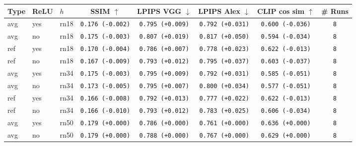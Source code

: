 \begin{tabular}{|l|l|l|c|c|c|c|c|}
\hline
Type & ReLU & $h$ & SSIM $\uparrow$ & LPIPS VGG $\downarrow$ & LPIPS Alex $\downarrow$ & CLIP cos sim $\uparrow$ & \# Runs \\
\hline
avg & yes & rn18 & \texttt{0.176 {\color{red}(-0.002)}} & \texttt{0.795 {\color{red}(+0.009)}} & \texttt{0.792 {\color{red}(+0.031)}} & \texttt{0.600 {\color{red}(-0.036)}} & \texttt{8} \\
avg & no & rn18 & \texttt{0.175 {\color{red}(-0.003)}} & \texttt{0.807 {\color{red}(+0.019)}} & \texttt{0.817 {\color{red}(+0.050)}} & \texttt{0.594 {\color{red}(-0.034)}} & \texttt{8} \\
ref & yes & rn18 & \texttt{0.170 {\color{red}(-0.004)}} & \texttt{0.786 {\color{red}(+0.007)}} & \texttt{0.778 {\color{red}(+0.023)}} & \texttt{0.622 {\color{red}(-0.013)}} & \texttt{8} \\
ref & no & rn18 & \texttt{0.167 {\color{red}(-0.009)}} & \texttt{0.793 {\color{red}(+0.012)}} & \texttt{0.795 {\color{red}(+0.037)}} & \texttt{0.603 {\color{red}(-0.037)}} & \texttt{8} \\
\hline
avg & yes & rn34 & \texttt{0.175 {\color{red}(-0.003)}} & \texttt{0.795 {\color{red}(+0.009)}} & \texttt{0.792 {\color{red}(+0.031)}} & \texttt{0.585 {\color{red}(-0.051)}} & \texttt{8} \\
avg & no & rn34 & \texttt{0.173 {\color{red}(-0.005)}} & \texttt{0.795 {\color{red}(+0.007)}} & \texttt{0.800 {\color{red}(+0.034)}} & \texttt{0.577 {\color{red}(-0.051)}} & \texttt{8} \\
ref & yes & rn34 & \texttt{0.166 {\color{red}(-0.008)}} & \texttt{0.792 {\color{red}(+0.013)}} & \texttt{0.777 {\color{red}(+0.022)}} & \texttt{0.622 {\color{red}(-0.013)}} & \texttt{8} \\
ref & no & rn34 & \texttt{0.166 {\color{red}(-0.010)}} & \texttt{0.793 {\color{red}(+0.012)}} & \texttt{0.783 {\color{red}(+0.025)}} & \texttt{0.606 {\color{red}(-0.034)}} & \texttt{8} \\
\hline
\rowcolor{verylightgray}avg & yes & rn50 & \texttt{0.179 {\color{black}(+0.000)}} & \texttt{0.786 {\color{black}(+0.000)}} & \texttt{0.761 {\color{black}(+0.000)}} & \texttt{0.636 {\color{black}(+0.000)}} & \texttt{8} \\
\rowcolor{verylightgray}avg & no & rn50 & \texttt{0.179 {\color{black}(+0.000)}} & \texttt{0.788 {\color{black}(+0.000)}} & \texttt{0.767 {\color{black}(+0.000)}} & \texttt{0.629 {\color{black}(+0.000)}} & \texttt{8} \\

\end{tabular}

